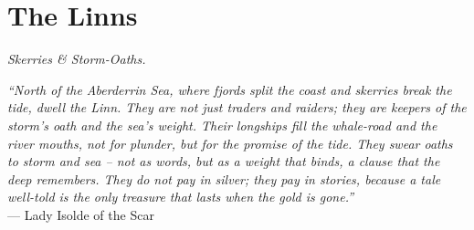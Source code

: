 \documentclass[12pt,oneside]{book}
\begin{document}


\newpage

\chapter{The Linns}
\emph{Skerries \& Storm-Oaths.}

\noindent
\textit{``North of the Aberderrin Sea, where fjords split the coast and skerries break the tide, dwell the Linn. They are not just traders and raiders; they are keepers of the storm's oath and the sea's weight. Their longships fill the whale-road and the river mouths, not for plunder, but for the promise of the tide. They swear oaths to storm and sea -- not as words, but as a weight that binds, a clause that the deep remembers. They do not pay in silver; they pay in stories, because a tale well-told is the only treasure that lasts when the gold is gone.''} \\
--- Lady Isolde of the Scar
\end{document}
